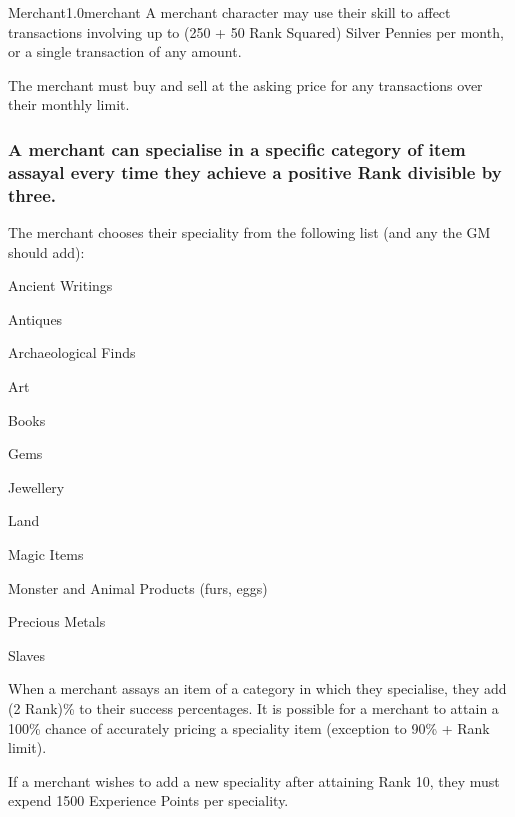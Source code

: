 \begin{skill}{Merchant}{1.0}{merchant}
A merchant character may use their skill to affect transactions
involving up to (250 + 50 \x Rank Squared) Silver Pennies per month,
or a single transaction of any amount.

The merchant must buy and sell at the asking price for any
transactions over their monthly limit.

\subsubsection{A merchant can specialise in a specific category
of item assayal every time they achieve a positive Rank divisible by
three.}

The merchant chooses their speciality from the following list (and any
the GM should add):
\begin{Enumerate}
\item Ancient Writings
\item Antiques
\item Archaeological Finds
\item Art
\item Books
\item Gems
\item Jewellery
\item Land
\item Magic Items
\item Monster and Animal Products (\eg furs, eggs)
\item Precious Metals
\item Slaves
\end{Enumerate}

When a merchant assays an item of a category in which they specialise,
they add (2 \x Rank)\% to their success percentages.  It is possible
for a merchant to attain a 100\% chance of accurately pricing a
speciality item (exception to 90\% + Rank limit).

If a merchant wishes to add a new speciality after attaining Rank 10,
they must expend 1500 Experience Points per speciality.

\end{skill}
